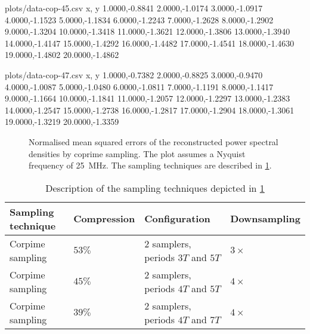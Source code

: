 \documentclass[a4paper, openany, oneside]{memoir}
\begin{document}
\begin{filecontents*}{plots/data-cop-45.csv}
x, y
1.0000,-0.8841
2.0000,-1.0174
3.0000,-1.0917
4.0000,-1.1523
5.0000,-1.1834
6.0000,-1.2243
7.0000,-1.2628
8.0000,-1.2902
9.0000,-1.3204
10.0000,-1.3418
11.0000,-1.3621
12.0000,-1.3806
13.0000,-1.3940
14.0000,-1.4147
15.0000,-1.4292
16.0000,-1.4482
17.0000,-1.4541
18.0000,-1.4630
19.0000,-1.4802
20.0000,-1.4862
\end{filecontents*}

\begin{filecontents*}{plots/data-cop-47.csv}
x, y
1.0000,-0.7382
2.0000,-0.8825
3.0000,-0.9470
4.0000,-1.0087
5.0000,-1.0480
6.0000,-1.0811
7.0000,-1.1191
8.0000,-1.1417
9.0000,-1.1664
10.0000,-1.1841
11.0000,-1.2057
12.0000,-1.2297
13.0000,-1.2383
14.0000,-1.2547
15.0000,-1.2738
16.0000,-1.2817
17.0000,-1.2904
18.0000,-1.3061
19.0000,-1.3219
20.0000,-1.3359
\end{filecontents*}

\begin{figure}
	\centering
	\caption{Normalised mean squared errors of the reconstructed power spectral densities by coprime sampling. The plot assumes a Nyquist frequency of \SI{25}{MHz}. The sampling techniques are described in \cref{tab:sampling-nmse-cop}.}
	\label{fig:plot-nmse-cop}
\end{figure}

\begin{table}
	\centering
	\begin{tabular}{llll}
		\textbf{Sampling technique} & \textbf{Compression} & \textbf{Configuration} & \textbf{Downsampling} \\ \hline
		Corpime sampling & $53\%$ & $2$ samplers, periods $3T$ and $5T$ & $3 \times$ \\
		Corpime sampling & $45\%$ & $2$ samplers, periods $4T$ and $5T$ & $4 \times$ \\
		Corpime sampling & $39\%$ & $2$ samplers, periods $4T$ and $7T$ & $4 \times$ \\
	\end{tabular}
	\caption{Description of the sampling techniques depicted in \cref{fig:plot-nmse-cop}}
	\label{tab:sampling-nmse-cop}
\end{table}
\end{document}
